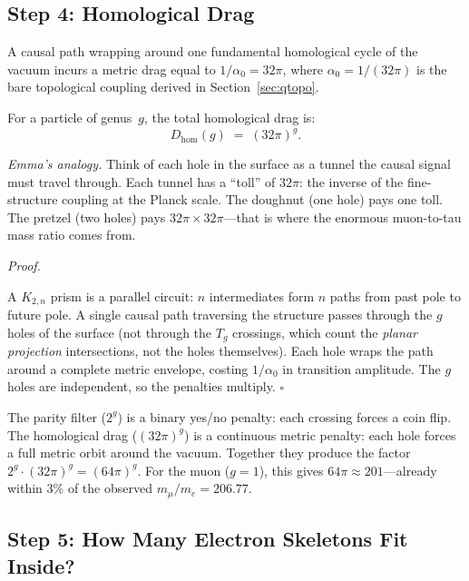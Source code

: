 \documentclass[11pt, a4paper, openany]{book}
\newcounter{thm}[chapter]
\renewenvironment{proof}[1][Proof]{%
  \par\noindent\textit{#1.}\quad
}{\hfill$\square$\par\medskip}
\begin{document}
\subsection{Step 4: Homological Drag}

\begin{theorem}
\label{thm:homology-drag}
A causal path wrapping around one fundamental homological cycle
of the vacuum incurs a metric drag equal to
$1/\alpha_0 = 32\pi$, where $\alpha_0 = 1/(32\pi)$ is
the bare topological coupling derived in
Section~\ref{sec:qtopo}.

For a particle of genus~$g$, the total homological drag is:
\[
  D_{\mathrm{hom}}(g) \;=\; (32\pi)^g.
\]
\end{theorem}

\smallskip\noindent
\textit{Emma's analogy.}
Think of each hole in the surface as a tunnel the causal signal
must travel through. Each tunnel has a ``toll'' of $32\pi$: the
inverse of the fine-structure coupling at the Planck scale.
The doughnut (one hole) pays one toll. The pretzel (two holes)
pays $32\pi \times 32\pi$---that is where the enormous muon-to-tau
mass ratio comes from.

\begin{proof}
A $K_{2,n}$ prism is a parallel circuit: $n$ intermediates form
$n$ paths from past pole to future pole. A single causal path
traversing the structure passes through the $g$ holes of the
surface (not through the $T_g$ crossings, which count
the \emph{planar projection} intersections, not the holes
themselves). Each hole wraps the path around a complete metric
envelope, costing $1/\alpha_0$ in transition amplitude.
The $g$ holes are independent, so the penalties multiply.
\end{proof}

\begin{logicalreading}
The parity filter ($2^g$) is a binary yes/no penalty: each
crossing forces a coin flip.
The homological drag ($(32\pi)^g$) is a continuous metric
penalty: each hole forces a full metric orbit around the vacuum.
Together they produce the factor
$2^g \cdot (32\pi)^g = (64\pi)^g$.  For the muon ($g = 1$),
this gives $64\pi \approx 201$---already within $3\%$ of the
observed $m_\mu/m_e = 206.77$.
\end{logicalreading}

\subsection{Step 5: How Many Electron Skeletons Fit Inside?}
\end{document}
